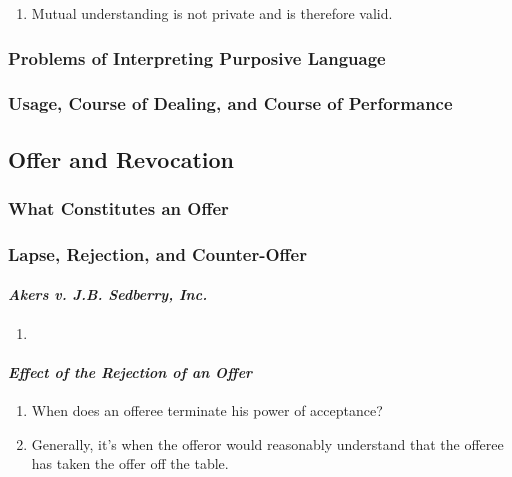 \begin{enumerate}
    \item Mutual understanding is not private and is therefore valid.
\end{enumerate}

\subsubsection{Problems of Interpreting Purposive Language}


\subsubsection{Usage, Course of Dealing, and Course of Performance}


\subsection{Offer and Revocation}

\subsubsection{What Constitutes an Offer}


\subsubsection{Lapse, Rejection, and Counter-Offer}

\paragraph{\emph{Akers v. J.B. Sedberry, Inc.}}

\begin{enumerate}
    \item %
\end{enumerate}

\paragraph{\emph{Effect of the Rejection of an Offer}}

\begin{enumerate}
    \item When does an offeree terminate his power of acceptance?
    \item Generally, it's when the offeror would reasonably understand that 
    the offeree has taken the offer off the table.
\end{enumerate}

